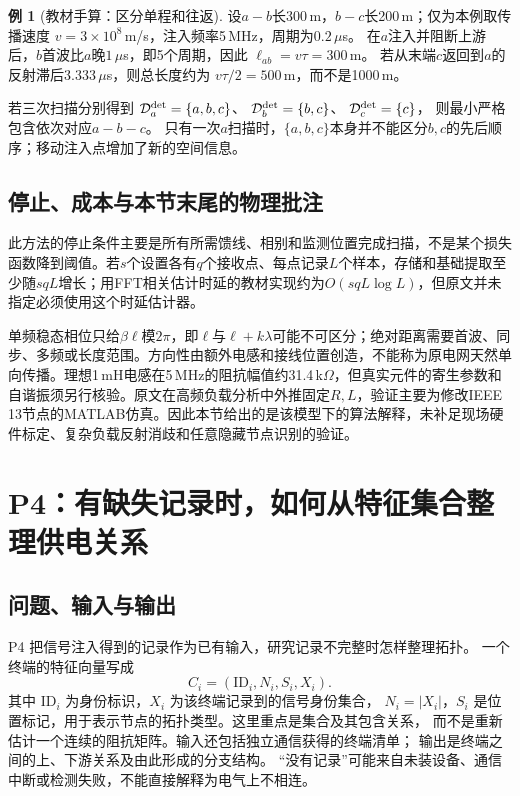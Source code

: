 \documentclass[UTF8,11pt,fontset=fandol,openany,oneside]{ctexbook}
\theoremstyle{definition}
\newtheorem{example}[theorem]{例}
\theoremstyle{remark}
\numberwithin{equation}{chapter}
\begin{document}
\begin{example}[教材手算：区分单程和往返]
设$a-b$长300\,m，$b-c$长200\,m；仅为本例取传播速度
$v=3\times10^8$\,m/s，注入频率5\,MHz，周期为$0.2\,\mu$s。
在$a$注入并阻断上游后，$b$首波比$a$晚$1\,\mu$s，即5个周期，因此
$\ell_{ab}=v\tau=300$\,m。
若从末端$c$返回到$a$的反射滞后$3.333\,\mu$s，则总长度约为
$v\tau/2=500$\,m，而不是1000\,m。

若三次扫描分别得到
$\mathcal D_a^{\rm det}=\{a,b,c\}$、
$\mathcal D_b^{\rm det}=\{b,c\}$、
$\mathcal D_c^{\rm det}=\{c\}$，
则最小严格包含依次对应$a-b-c$。
只有一次$a$扫描时，$\{a,b,c\}$本身并不能区分$b,c$的先后顺序；移动注入点增加了新的空间信息。
\end{example}

\subsection{停止、成本与本节末尾的物理批注}

此方法的停止条件主要是所有所需馈线、相别和监测位置完成扫描，不是某个损失函数降到阈值。若$s$个设置各有$q$个接收点、每点记录$L$个样本，存储和基础提取至少随$sqL$增长；用FFT相关估计时延的教材实现约为$O(sqL\log L)$，但原文并未指定必须使用这个时延估计器。

单频稳态相位只给$\beta\ell$模$2\pi$，即$\ell$与$\ell+k\lambda$可能不可区分；绝对距离需要首波、同步、多频或长度范围。方向性由额外电感和接线位置创造，不能称为原电网天然单向传播。理想1\,mH电感在5\,MHz的阻抗幅值约31.4\,k$\Omega$，但真实元件的寄生参数和自谐振须另行核验。原文在高频负载分析中外推固定$R,L$，验证主要为修改IEEE 13节点的MATLAB仿真。因此本节给出的是该模型下的算法解释，未补足现场硬件标定、复杂负载反射消歧和任意隐藏节点识别的验证。


\section{P4：有缺失记录时，如何从特征集合整理供电关系}\label{sec:tb-P4}

\subsection{问题、输入与输出}
P4 把信号注入得到的记录作为已有输入，研究记录不完整时怎样整理拓扑。\citep{P4}
一个终端的特征向量写成
\[
 C_i=(\mathrm{ID}_i,N_i,S_i,X_i).
\]
其中 $\mathrm{ID}_i$ 为身份标识，$X_i$ 为该终端记录到的信号身份集合，
$N_i=|X_i|$，$S_i$ 是位置标记，用于表示节点的拓扑类型。这里重点是集合及其包含关系，
而不是重新估计一个连续的阻抗矩阵。输入还包括独立通信获得的终端清单；
输出是终端之间的上、下游关系及由此形成的分支结构。
“没有记录”可能来自未装设备、通信中断或检测失败，不能直接解释为电气上不相连。
\end{document}
